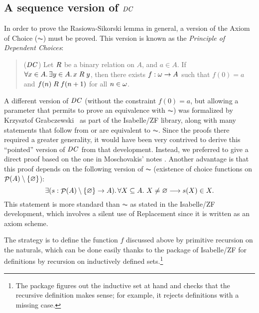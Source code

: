 \subsection{A sequence version of $\mathit{DC}$}\label{sec:sequence-version-dc}
In order to prove the Rasiowa-Sikorski lemma in
general, a version of the Axiom of Choice ($\AC$) must be proved. This
version is known as the \emph{Principle of Dependent Choices}:
\begin{quote}
  ($\mathit{DC}$) Let $\mathrel{R}$ be a binary relation on $A$, and $a\in A$. If
  $\forall x\in A.\,  \exists y\in A.\, x\mathrel{R} y$, then there exists
  $f:\omega\to A$ such that $f(0)=a$ and $f(n)\mathrel{R} f(n+1)$ for all
  $n\in\omega$.
\end{quote}

A different version of $\mathit{DC}$ (without the constraint $f(0)=a$, but
allowing a parameter that permits to prove an equivalence with $\AC$)
was formalized by Krzysztof
Grabczewski~\cite{DBLP:journals/jar/PaulsonG96} as part of the
Isabelle/ZF library, along with many statements that follow from or
are equivalent to $\AC$. Since the proofs there required a greater
generality, it would have been very contrived to derive this
``pointed'' version of $\mathit{DC}$ from that development. Instead, we
preferred to give a direct proof based on the one in
Moschovakis' notes \cite{moschovakis1994notes}. Another advantage is that
this proof depends on the following version of $\AC$ (existence of
choice functions on $\mathop{\mathcal{P}}(A)\setminus \{\varnothing\}$):
\[
\exists (s: \mathop{\mathcal{P}}(A)\setminus \{\varnothing\}\to A). \, \forall X\subseteq A.\ X\neq \varnothing \longrightarrow
s(X) \in X.
\]
This statement is more standard than $\AC$ as stated in the
Isabelle/ZF development, which involves a silent use of Replacement
since it is written as an axiom scheme. 

The strategy is to define the function $f$ discussed above by
primitive recursion on the naturals, which can be done easily thanks
to the package of Isabelle/ZF
\cite{paulson1995set,paulson2000fixedpoint} for definitions by
recursion on inductively defined sets.\footnote{The package figures
  out the inductive set at hand and checks that the recursive
  definition makes sense; for example, it rejects definitions with a
  missing case.}

